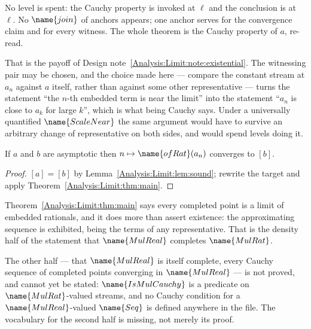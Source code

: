 \begin{remark}\label{Analysis:Limit:rem:free}
No level is spent: the Cauchy property is invoked at $\ell$ and the conclusion
is at $\ell$.  No $\name{join}$ of anchors appears; one anchor serves for the
convergence claim and for every witness.  The whole theorem is the Cauchy
property of $a$, re-read.

That is the payoff of
Design note~\ref{Analysis:Limit:note:existential}.  The witnessing pair may be
chosen, and the choice made here --- compare the constant stream at $a_n$
against $a$ itself, rather than against some other representative --- turns the
statement ``the $n$-th embedded term is near the limit'' into the statement
``$a_n$ is close to $a_k$ for large $k$'', which is what being Cauchy says.
Under a universally quantified $\name{ScaleNear}$ the same argument would have
to survive an arbitrary change of representative on both sides, and would spend
levels doing it.
\end{remark}

\begin{corollary}
\label{Analysis:Limit:cor:asymptotic}
If $a$ and $b$ are asymptotic then $n \mapsto \name{ofRat}(a_n)$ converges to
$[b]$.
\end{corollary}

\begin{proof}
$[a] = [b]$ by Lemma~\ref{Analysis:Limit:lem:sound}; rewrite the target and
apply Theorem~\ref{Analysis:Limit:thm:main}.
\end{proof}

\begin{remark}
\label{Analysis:Limit:rem:density}
Theorem~\ref{Analysis:Limit:thm:main} says every completed point is a limit of
embedded rationals, and it does more than assert existence: the approximating
sequence is exhibited, being the terms of any representative.  That is the
density half of the statement that $\name{MulReal}$ completes $\name{MulRat}$.

The other half --- that $\name{MulReal}$ is itself complete, every Cauchy
sequence of completed points converging in $\name{MulReal}$ --- is not proved,
and cannot yet be stated: $\name{IsMulCauchy}$ is a predicate on
$\name{MulRat}$-valued streams, and no Cauchy condition for a
$\name{MulReal}$-valued $\name{Seq}$ is defined anywhere in the file.  The
vocabulary for the second half is missing, not merely its proof.
\end{remark}

